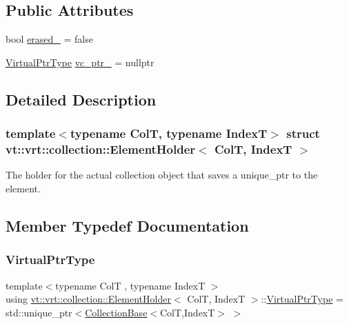 \subsection*{Public Attributes}
\begin{DoxyCompactItemize}
\item 
bool \hyperlink{structvt_1_1vrt_1_1collection_1_1_element_holder_ae832cd8e53efb97b0b57497320d3fa2f}{erased\+\_\+} = false
\item 
\hyperlink{structvt_1_1vrt_1_1collection_1_1_element_holder_afc12d1a71ec8f735f1b7fe12a067c8a6}{Virtual\+Ptr\+Type} \hyperlink{structvt_1_1vrt_1_1collection_1_1_element_holder_a2112b3755d594225583fb89ab3185bd2}{vc\+\_\+ptr\+\_\+} = nullptr
\end{DoxyCompactItemize}


\subsection{Detailed Description}
\subsubsection*{template$<$typename ColT, typename IndexT$>$\newline
struct vt\+::vrt\+::collection\+::\+Element\+Holder$<$ Col\+T, Index\+T $>$}

The holder for the actual collection object that saves a unique\+\_\+ptr to the element. 

\subsection{Member Typedef Documentation}
\mbox{\label{structvt_1_1vrt_1_1collection_1_1_element_holder_afc12d1a71ec8f735f1b7fe12a067c8a6}} 
\subsubsection{\texorpdfstring{Virtual\+Ptr\+Type}{VirtualPtrType}}
{\footnotesize\ttfamily template$<$typename ColT , typename IndexT $>$ \\
using \hyperlink{structvt_1_1vrt_1_1collection_1_1_element_holder}{vt\+::vrt\+::collection\+::\+Element\+Holder}$<$ ColT, IndexT $>$\+::\hyperlink{structvt_1_1vrt_1_1collection_1_1_element_holder_afc12d1a71ec8f735f1b7fe12a067c8a6}{Virtual\+Ptr\+Type} =  std\+::unique\+\_\+ptr$<$\hyperlink{structvt_1_1vrt_1_1collection_1_1_collection_base}{Collection\+Base}$<$ColT,IndexT$>$ $>$}




